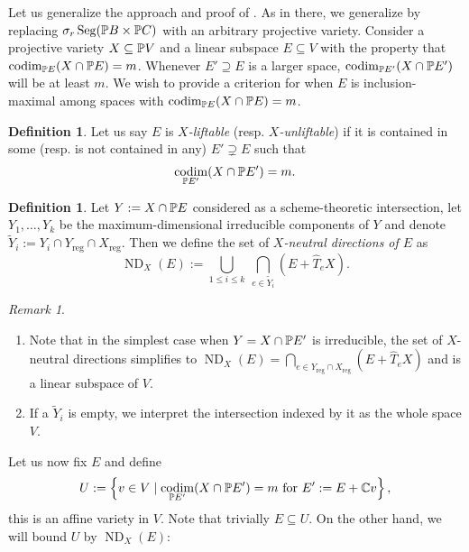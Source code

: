 \documentclass[a4paper,10pt]{article}
\def\reg{\text{reg}}
\def\set#1{\left\{#1\right\}}
\DeclareMathOperator{\codim}{codim}
\DeclareMathOperator{\ND}{ND}
\DeclareMathOperator{\Seg}{Seg}
\theoremstyle{definition}
\newtheorem{definition}[theorem]{Definition}
\theoremstyle{remark}
\newtheorem*{remark}{Remark}
\begin{document}
Let us generalize the approach and proof of \cite[Section 3]{draisma}. As in there, we generalize by replacing $\sigma_r \Seg(\pe B\times\pe C)$ with an arbitrary projective variety. Consider a projective variety $X\subseteq \pe V$ and a linear subspace $E\subseteq V$ with the property that $\codim_{\pe E}(X \cap \pe E) = m$. Whenever $E'\supseteq E$ is a larger space, $\codim_{\pe E'}(X\cap \pe E')$ will be at least $m$. We wish to provide a criterion for when $E$ is inclusion-maximal among spaces with $\codim_{\pe E}(X\cap \pe E)=m$.

\begin{definition}
    Let us say $E$ is \emph{$X$-liftable} (resp. \emph{$X$-unliftable}) if it is contained in some (resp. is not contained in any) $E'\supsetneq E$ such that
    \[
        \codim_{\pe E'} (X\cap \pe E') = m.
    \]
\end{definition}

\begin{definition}
    \label{def:NDX}
    Let $Y:=X\cap\pe E$ considered as a scheme-theoretic intersection, let $Y_1,\dots,Y_k$ be the maximum-dimensional irreducible components of $Y$ and denote $\tilde Y_i := Y_i\cap Y_\reg\cap X_\reg$.
    Then we define the set of \emph{$X$-neutral directions of $E$} as
    \[
        \ND_X(E) := \bigcup_{1\leq i\leq k}\ \bigcap_{e\in \tilde Y_i}(E+\hat T_{e}X).
    \]
\end{definition}
\begin{remark}
    \begin{enumerate}
    \item Note that in the simplest case when $Y=X\cap \pe E'$ is irreducible, the set of $X$-neutral directions simplifies to
    $\ND_X(E) = \bigcap_{e\in Y_\reg\cap X_\reg} (E+\hat T_e X)$ and is a linear subspace of $V$.
    \item If a $\tilde Y_i$ is empty, we interpret the intersection indexed by it as the whole space $V$.
    \end{enumerate}
\end{remark}


Let us now fix $E$ and define
\[
    U := \set{v\in V\mid \text{$\codim_{\pe E'}(X\cap \pe E')=m$ for $E':= E+\ce v$}},
\]
this is an affine variety in $V$. Note that trivially $E\subseteq U$. On the other hand, we will bound $U$ by $\ND_X(E)$:
\end{document}
